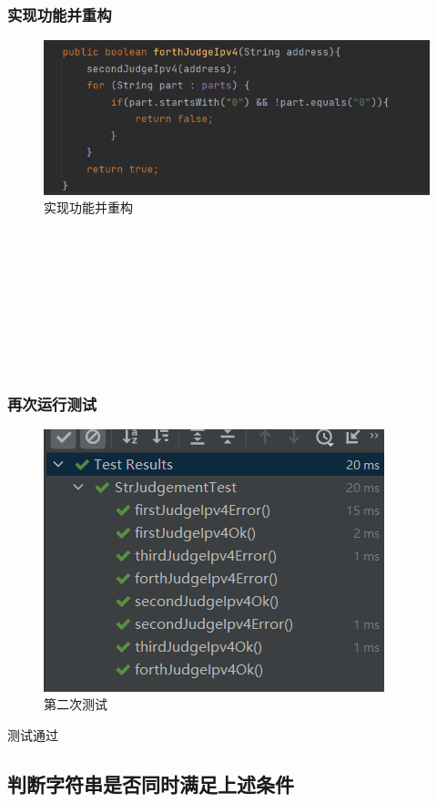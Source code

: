\documentclass[a4paper]{article}
\begin{document}
\subsubsection*{实现功能并重构}
\begin{figure}[h]
    \centering
    \includegraphics[scale=0.8]{4.4.png}
    \caption{实现功能并重构}
    \label{fig:20}
\end{figure}
~\\~\\~\\~\\~\\~\\~\\~\\
\subsubsection*{再次运行测试}
\begin{figure}[h]
    \centering
    \includegraphics[scale=0.9]{4.5.png}
    \caption{第二次测试}
    \label{fig:21}
\end{figure}
测试通过

\subsection{判断字符串是否同时满足上述条件}
\end{document}
